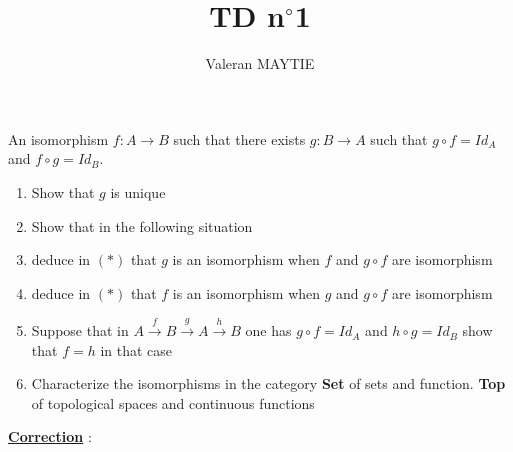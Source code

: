 \documentclass{article}
\title{TD n$^\circ$1}
\author{Valeran MAYTIE}
\date{}
\theoremstyle{plain}
\begin{document}
  \maketitle

  An isomorphism $f : A \to B$ such that there exists $g: B \to A$ such that $g
  \circ f = Id_A$ and $f \circ g = Id_B$.

  \begin{enumerate}
    \item Show that $g$ is unique
    \item Show that in the following situation

    \begin{center}
    \end{center}

    \item deduce in $(*)$ that $g$ is an isomorphism when $f$ and $g \circ f$ are
      isomorphism
    \item deduce in $(*)$ that $f$ is an isomorphism when $g$ and $g \circ f$ are
      isomorphism
    \item Suppose that in $A \xrightarrow{f} B \xrightarrow{g} A \xrightarrow{h}
      B$ one has $g \circ f = Id_A$ and $h \circ g = Id_B$ show that $f = h$
      in that case
    \item Characterize the isomorphisms in the category {\bf Set} of sets and
      function. {\bf Top} of topological spaces and continuous functions
  \end{enumerate}

  \newpage
  \underline{\bf Correction} :
\end{document}
